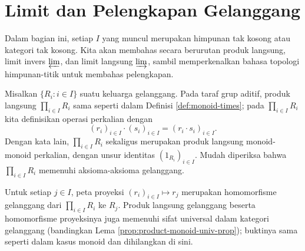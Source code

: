 \section{Limit dan Pelengkapan Gelanggang}\label{sec:ring-limits}
Dalam bagian ini, setiap $I$ yang muncul merupakan himpunan tak kosong atau kategori tak kosong. Kita akan membahas secara berurutan produk langsung, limit invers $\varprojlim$, dan limit langsung $\varinjlim$, sambil memperkenalkan bahasa topologi himpunan-titik untuk membahas pelengkapan.

\begin{definition}\label{def:ring-direct-product}
	Misalkan $\{R_i : i \in I\}$ suatu keluarga gelanggang. Pada taraf grup aditif, produk langsung $\prod_{i \in I} R_i$ sama seperti dalam Definisi \ref{def:monoid-times}; pada $\prod_{i \in I} R_i$ kita definisikan operasi perkalian dengan
	\[ (r_i)_{i \in I} \cdot (s_i)_{i \in I} = (r_i \cdot s_i)_{i \in I}. \]
	Dengan kata lain, $\prod_{i \in I} R_i$ sekaligus merupakan produk langsung monoid-monoid perkalian, dengan unsur identitas $(1_{R_i})_{i \in I}$. Mudah diperiksa bahwa $\prod_{i \in I} R_i$ memenuhi aksioma-aksioma gelanggang.
\end{definition}

Untuk setiap $j \in I$, peta proyeksi $(r_i)_{i \in I} \mapsto r_j$ merupakan homomorfisme gelanggang dari $\prod_{i \in I} R_i$ ke $R_j$. Produk langsung gelanggang beserta homomorfisme proyeksinya juga memenuhi sifat universal dalam kategori gelanggang (bandingkan Lema \ref{prop:product-monoid-univ-prop}); buktinya sama seperti dalam kasus monoid dan dihilangkan di sini.

